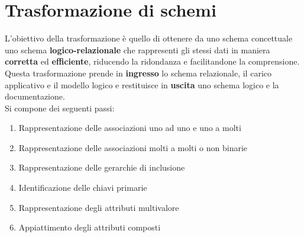 \newpage
\section{Trasformazione di schemi}
L'obiettivo della trasformazione è quello di ottenere da uno schema concettuale uno schema \textbf{logico-relazionale} che rappresenti gli stessi dati in maniera \textbf{corretta} ed \textbf{efficiente}, riducendo la ridondanza e facilitandone la comprensione.\\
Questa trasformazione prende in \textbf{ingresso} lo schema relazionale, il carico applicativo e il modello logico e restituisce in \textbf{uscita} uno schema logico e la documentazione.\\
Si compone dei seguenti passi:
\begin{enumerate}
	\item Rappresentazione delle associazioni uno ad uno e uno a molti
	\item Rappresentazione delle associazioni molti a molti o non binarie
	\item Rappresentazione delle gerarchie di inclusione
	\item Identificazione delle chiavi primarie
	\item Rappresentazione degli attributi multivalore
	\item Appiattimento degli attributi composti
\end{enumerate}

